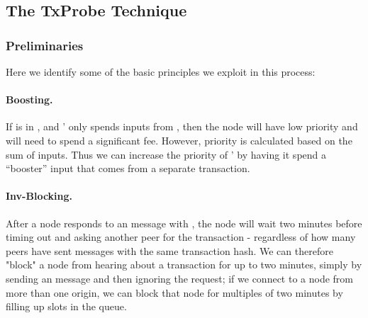\subsection{The TxProbe Technique}

\subsubsection{Preliminaries}

Here we identify some of the basic principles we exploit in this process:

\paragraph{Boosting.}
If \tx is in , and \tx' only spends inputs from \tx, then the node will have low priority and will need to spend a significant fee. However, priority is calculated based on the sum of inputs. Thus we can increase the priority of \tx' by having it spend a ``booster'' input that comes from a separate transaction. 


\paragraph{Inv-Blocking.}
 After a node responds to an  message with , the node will wait two minutes before timing out and asking another peer for the transaction - regardless of how many peers have sent  messages with the same transaction hash. We can therefore "block" a node from hearing about a transaction for up to two minutes, simply by sending an  message and then ignoring the  request; if we connect to a node from more than one origin, we can block that node for multiples of two minutes by filling up slots in the  queue.

